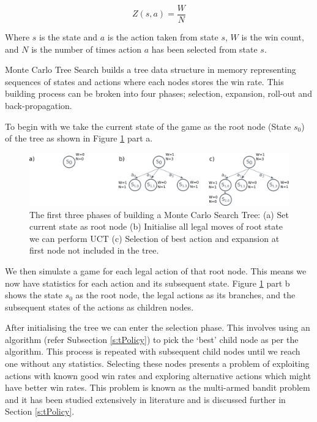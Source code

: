 \documentclass{bhamthesis}
\theoremstyle{definition}
\begin{document}
\begin{equation}\label{utility}
Z(s,a) = \frac{W}{N}
\end{equation} 

Where $s$ is the state and $a$ is the action taken from state $s$, $W$ is the win count, and $N$ is the number of times action $a$ has been selected from state $s$.

Monte Carlo Tree Search builds a tree data structure in memory representing sequences of states and actions where each nodes stores the win rate. This building process can be broken into four phases; selection, expansion, roll-out and back-propagation.

To begin with we take the current state of the game as the root node (State $s_0$) of the tree as shown in Figure \ref{f:initTree} part a.
\begin{figure}
	\centering
	\includegraphics[width=\textwidth]{media/img/mctsTreeBuildPartOne}
	\caption{The first three phases of building a Monte Carlo Search Tree: (a) Set current state as root node (b) Initialise all legal moves of root state we can perform UCT (c) Selection of best action and expansion at first node not included in the tree.}\label{f:initTree}
\end{figure}
We then simulate a game for each legal action of that root node. This means we now have statistics for each action and its subsequent state. Figure \ref{f:initTree} part b shows the state $s_0$ as the root node, the legal actions as its branches, and the subsequent states of the actions as children nodes.

After initialising the tree we can enter the selection phase. This involves using an algorithm (refer Subsection \ref{s:tPolicy}) to pick the `best' child node as per the algorithm. This process is repeated with subsequent child nodes until we reach one without any statistics. Selecting these nodes presents a problem of exploiting actions with known good win rates and exploring alternative actions which might have better win rates. This problem is known as the multi-armed bandit problem and it has been studied extensively in literature and is discussed further in Section \ref{s:tPolicy}.
\end{document}
